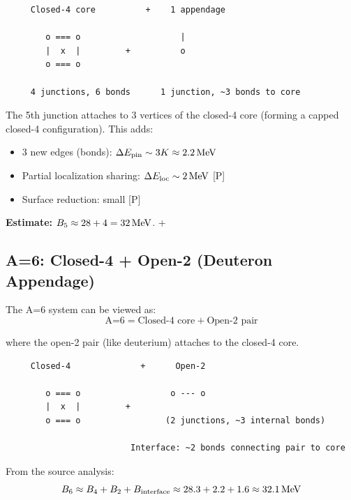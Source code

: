 \begin{center}
\begin{verbatim}
     Closed-4 core          +    1 appendage

        o === o                    |
        |  x  |         +          o
        o === o

     4 junctions, 6 bonds      1 junction, ~3 bonds to core
\end{verbatim}
\end{center}

The 5th junction attaches to 3 vertices of the closed-4 core (forming a
capped closed-4 configuration). This adds:
\begin{itemize}
    \item 3 new edges (bonds): $\Delta E_{\text{pin}} \sim 3K \approx 2.2\,\mathrm{MeV}$
    \item Partial localization sharing: $\Delta E_{\text{loc}} \sim 2\,\mathrm{MeV}$ [P]
    \item Surface reduction: small [P]
\end{itemize}

\textbf{Estimate:} $B_5 \approx 28 + 4 = 32\,\mathrm{MeV}$. \tagP + \tagI

\subsection{A=6: Closed-4 + Open-2 (Deuteron Appendage)}

The A=6 system can be viewed as:
\begin{equation}
    \text{A=6} = \text{Closed-4 core} + \text{Open-2 pair}
\end{equation}

where the open-2 pair (like deuterium) attaches to the closed-4 core.

\begin{center}
\begin{verbatim}
     Closed-4              +      Open-2

        o === o                  o --- o
        |  x  |         +
        o === o                 (2 junctions, ~3 internal bonds)

                         Interface: ~2 bonds connecting pair to core
\end{verbatim}
\end{center}

From the source analysis:
\begin{equation}
    B_6 \approx B_4 + B_2 + B_{\text{interface}}
    \approx 28.3 + 2.2 + 1.6 \approx 32.1\,\mathrm{MeV}
    \label{eq:li6_cluster}
\end{equation}

